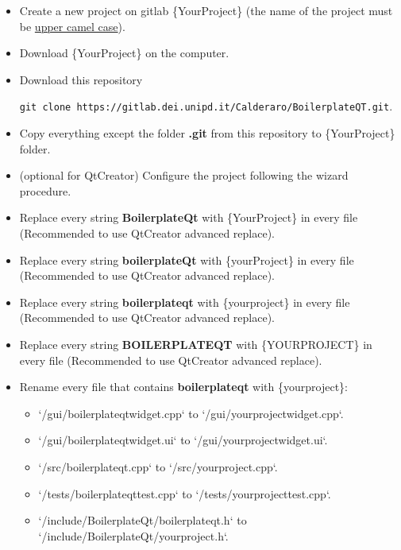 \begin{itemize}
      \tightlist
      \item
            Create a new project on gitlab \{YourProject\} (the name of the
            project must be \href{https://en.wikipedia.org/wiki/Camel_case}{upper
                  camel case}).
      \item
            Download \{YourProject\} on the computer.
      \item
            Download this repository

            \texttt{git\ clone\ https://gitlab.dei.unipd.it/Calderaro/BoilerplateQT.git}.
      \item
            Copy everything except the folder \textbf{.git} from this repository
            to \{YourProject\} folder.
      \item
            (optional for QtCreator) Configure the project following the wizard procedure.
      \item
            Replace every string \textbf{BoilerplateQt} with \{YourProject\} in
            every file (Recommended to use QtCreator advanced replace).
      \item
            Replace every string \textbf{boilerplateQt} with \{yourProject\} in
            every file (Recommended to use QtCreator advanced replace).
      \item
            Replace every string \textbf{boilerplateqt} with \{yourproject\} in
            every file (Recommended to use QtCreator advanced replace).
      \item
            Replace every string \textbf{BOILERPLATEQT} with \{YOURPROJECT\} in
            every file (Recommended to use QtCreator advanced replace).
      \item
            Rename every file that contains \textbf{boilerplateqt} with
            \{yourproject\}:
            \begin{itemize}
                  \tightlist
                  \item
                        `/gui/boilerplateqtwidget.cpp` to `/gui/{yourproject}widget.cpp`.

                  \item
                        `/gui/boilerplateqtwidget.ui` to `/gui/{yourproject}widget.ui`.

                  \item
                        `/src/boilerplateqt.cpp` to `/src/{yourproject}.cpp`.

                  \item
                        `/tests/boilerplateqttest.cpp` to `/tests/{yourproject}test.cpp`.

                  \item
                        `/include/BoilerplateQt/boilerplateqt.h` to `/include/BoilerplateQt/{yourproject}.h`.
            \end{itemize}
\end{itemize}


